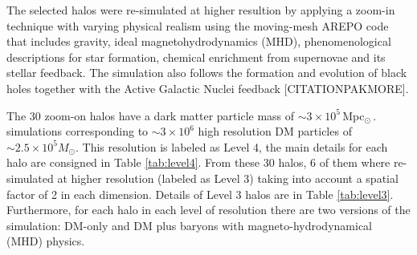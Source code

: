 \documentclass[a4paper,fleqn,usenatbib]{mnras}
\newcommand{\Msun}{\,{\rm Mpc}$_{\odot}$\,}
\begin{document}
The selected halos were re-simulated at higher resultion by applying a
zoom-in technique with varying physical realism using the moving-mesh AREPO code
that includes gravity, ideal magnetohydrodynamics (MHD), 
phenomenological descriptions for star formation, chemical enrichment
from supernovae and its stellar feedback.  The simulation also follows
the formation and evolution of black holes together with the Active
Galactic Nuclei feedback \citep{arepo} [CITATIONPAKMORE].  



The 30 zoom-on halos have a dark matter particle mass of $\sim 3\times
10^5$\Msun.
simulations corresponding to $\sim 3\times 10^6$ high resolution DM
particles of $\sim 2.5 \times 10^5 M_\odot$.  
This resolution is labeled as Level 4, the main details for each halo
are consigned in Table \ref{tab:level4}. 
From these 30 halos, 6 of them where re-simulated at higher resolution
(labeled as Level 3) taking into account a spatial factor of 2 in each
dimension.   
Details of Level 3 halos are in Table \ref{tab:level3}. 
Furthermore, for each halo in each level of resolution there are two
versions of the simulation: DM-only and DM plus baryons with
magneto-hydrodynamical (MHD) physics.  
\end{document}
